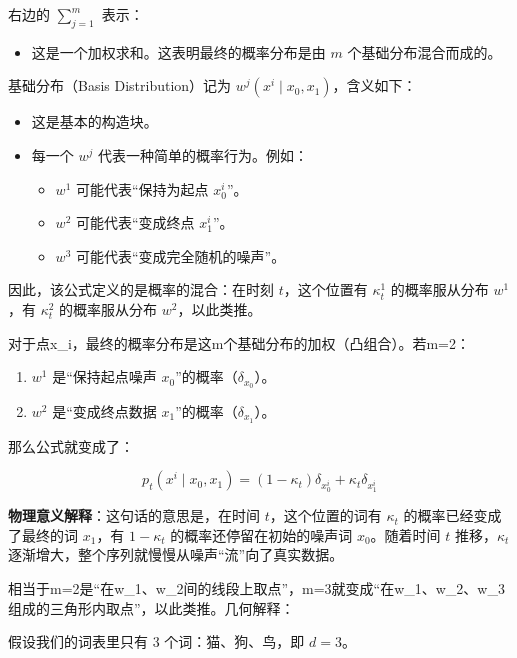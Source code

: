 右边的 \(\sum_{j=1}^m\) 表示：

\begin{itemize}
\tightlist
\item
  这是一个加权求和。这表明最终的概率分布是由 \(m\) 个基础分布混合而成的。
\end{itemize}

基础分布（Basis Distribution）记为 \(w^j(x^i\mid x_0,x_1)\)，含义如下：

\begin{itemize}
\tightlist
\item
  这是基本的构造块。
\item
  每一个 \(w^j\) 代表一种简单的概率行为。例如：

  \begin{itemize}
  \tightlist
  \item
    \(w^1\) 可能代表``保持为起点 \(x_0^i\)''。
  \item
    \(w^2\) 可能代表``变成终点 \(x_1^i\)''。
  \item
    \(w^3\) 可能代表``变成完全随机的噪声''。
  \end{itemize}
\end{itemize}

因此，该公式定义的是概率的混合：在时刻 \(t\)，这个位置有 \(\kappa_t^1\) 的概率服从分布 \(w^1\)，有 \(\kappa_t^2\) 的概率服从分布 \(w^2\)，以此类推。

对于点x\_i，最终的概率分布是这m个基础分布的加权（凸组合）。若m=2：

\begin{enumerate}
\def\labelenumi{\arabic{enumi}.}
\tightlist
\item
  \(w^1\) 是``保持起点噪声 \(x_0\)''的概率（\(\delta_{x_0}\)）。
\item
  \(w^2\) 是``变成终点数据 \(x_1\)''的概率（\(\delta_{x_1}\)）。
\end{enumerate}

那么公式就变成了：

\[
p_t(x^i\mid x_0,x_1)=(1-\kappa_t)\delta_{x_0^i}+\kappa_t\delta_{x_1^i}
\]

\textbf{物理意义解释}：这句话的意思是，在时间 \(t\)，这个位置的词有 \(\kappa_t\) 的概率已经变成了最终的词 \(x_1\)，有 \(1-\kappa_t\) 的概率还停留在初始的噪声词 \(x_0\)。随着时间 \(t\) 推移，\(\kappa_t\) 逐渐增大，整个序列就慢慢从噪声``流''向了真实数据。

相当于m=2是``在w\_1、w\_2间的线段上取点''，m=3就变成``在w\_1、w\_2、w\_3组成的三角形内取点''，以此类推。几何解释：

假设我们的词表里只有 3 个词：猫、狗、鸟，即 \(d=3\)。

